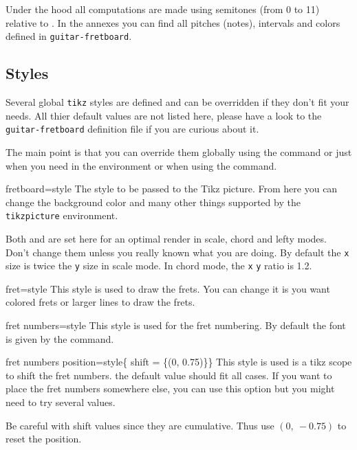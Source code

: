 \documentclass[a4paper]{article}
\newcommand{\pkg}[1]{\texttt{#1}}
\begin{document}
Under the hood all computations are made using semitones (from 0 to 11)
relative to \pC. In the annexes you can find all pitches (notes), intervals
and colors defined in \pkg{guitar-fretboard}.

\subsection{Styles}

Several global \pkg{tikz} styles are defined and can be overridden if they
don't fit your needs. All thier default values are not listed here, please
have a look to the \pkg{guitar-fretboard} definition file if you are curious
about it.

The main point is that you can override them globally using the 
command or just when you need in the  environment or when using
the  command.

\begin{docKey}[tikz][]{fretboard}{=style}{}
  The style to be passed to the Tikz picture. From here you can change the
  background color and many other things supported by the \pkg{tikzpicture}
  environment.

  Both  and  are set here for an optimal render in
  scale, chord and lefty modes. Don't change them unless you really known
  what you are doing. By default the \pkg{x} size is twice the \pkg{y} size
  in scale mode. In chord mode, the \pkg{x} \pkg{y} ratio is 1.2.
\end{docKey}

\begin{docKey}[tikz][]{fret}{=style}{}
  This style is used to draw the frets. You can change it is you want
  colored frets or larger lines to draw the frets.
\end{docKey}

\begin{docKey}[tikz][]{fret numbers}{=style}{}
  This style is used for the fret numbering. By default the font is given by
  the  command.
\end{docKey}

\begin{docKey}[tikz][]{fret numbers position}{=style}{\{ shift = \{(0, 0.75)\}\}}
  This style is used is a tikz scope to shift the fret numbers. the default
  value should fit all cases. If you want to place the fret numbers
  somewhere else, you can use this option but you might need to try several
  values.

  Be careful with shift values since they are cumulative. Thus use
  $(0,~-0.75)$ to reset the position.
\end{docKey}
\end{document}

